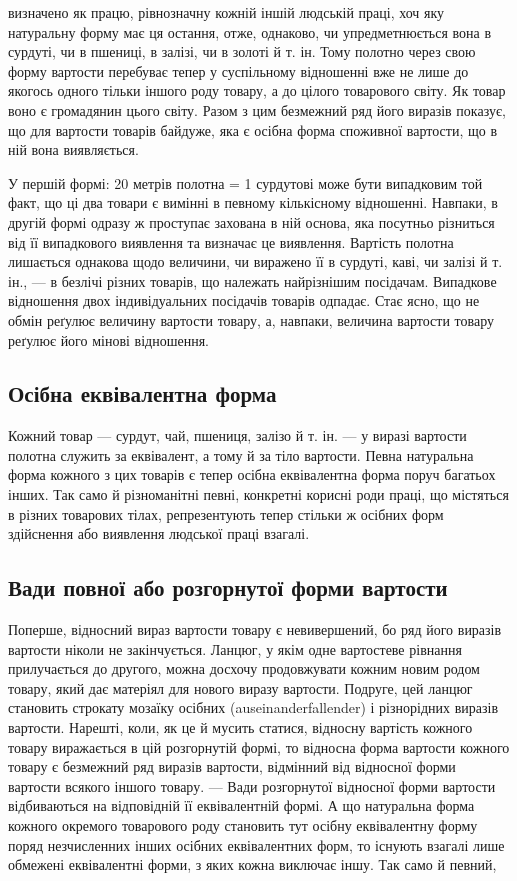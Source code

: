 \parcont{}  %
визначено як працю, рівнозначну кожній іншій людській праці,
хоч яку натуральну форму має ця остання, отже, однаково, чи
упредметнюється вона в сурдуті, чи в пшениці, в залізі, чи в
золоті й т. ін. Тому полотно через свою форму вартости перебуває
тепер у суспільному відношенні вже не лише до якогось одного
тільки іншого роду товару, а до цілого товарового світу. Як
товар воно є громадянин цього світу. Разом з цим безмежний ряд
його виразів показує, що для вартости товарів байдуже, яка є
осібна форма споживної вартости, що в ній вона виявляється.

У першій формі: 20 метрів полотна = 1 сурдутові може бути
випадковим той факт, що ці два товари є вимінні в певному кількісному
відношенні. Навпаки, в другій формі одразу ж проступає
захована в ній основа, яка посутньо різниться від її випадкового
виявлення та визначає це виявлення. Вартість полотна лишається
однакова щодо величини, чи виражено її в сурдуті, каві, чи
залізі й т. ін., — в безлічі різних товарів, що належать найрізнішим
посідачам. Випадкове відношення двох індивідуальних посідачів
товарів одпадає. Стає ясно, що не обмін реґулює величину
вартости товару, а, навпаки, величина вартости товару реґулює
його мінові відношення.

\subsection{Осібна еквівалентна форма}

Кожний товар — сурдут, чай, пшениця, залізо й т. ін. — у
виразі вартости полотна служить за еквівалент, а тому й за тіло
вартости. Певна натуральна форма кожного з цих товарів є тепер
осібна еквівалентна форма поруч багатьох інших. Так само й
різноманітні певні, конкретні корисні роди праці, що містяться
в різних товарових тілах, репрезентують тепер стільки ж осібних
форм здійснення або виявлення людської праці взагалі.

\subsection{Вади повної або розгорнутої форми вартости}

Поперше, відносний вираз вартости товару є невивершений,
бо ряд його виразів вартости ніколи не закінчується. Ланцюг, у
якім одне вартостеве рівнання прилучається до другого, можна
досхочу продовжувати кожним новим родом товару, який дає
матеріял для нового виразу вартости. Подруге, цей ланцюг становить
строкату мозаїку осібних (auseinanderfallender) і різнорідних
виразів вартости. Нарешті, коли, як це й мусить статися,
відносну вартість кожного товару виражається в цій розгорнутій
формі, то відносна форма вартости кожного товару є безмежний
ряд виразів вартости, відмінний від відносної форми вартости
всякого іншого товару. — Вади розгорнутої відносної форми вартости
відбиваються на відповідній її еквівалентній формі. А що
натуральна форма кожного окремого товарового роду становить
тут осібну еквівалентну форму поряд незчисленних інших осібних
еквівалентних форм, то існують взагалі лише обмежені еквівалентні
форми, з яких кожна виключає іншу. Так само й певний,
\parbreak{}  %
